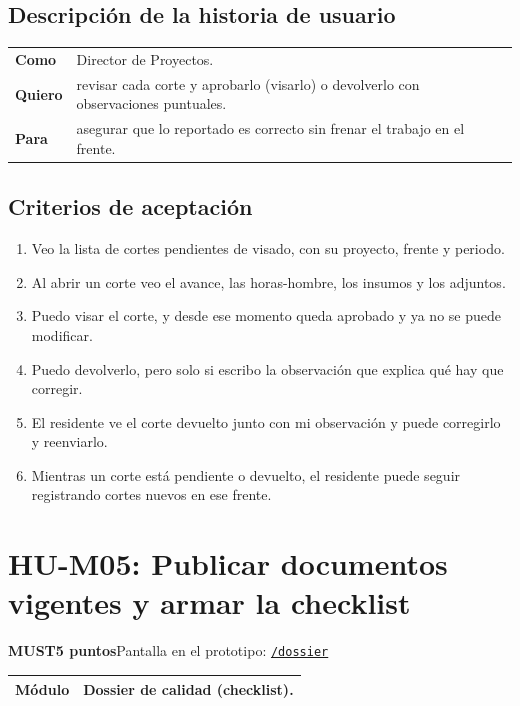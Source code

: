 \documentclass[11pt]{article}
\newcommand{\urlapp}{https://thankstochatgpt.github.io/LOARD}
\newcommand{\app}[1]{\href{\urlapp#1}{\texttt{#1}}}
\newcommand{\etiqueta}[1]{\colorbox{barra}{\textbf{\color{marca}#1}}}
\begin{document}
\subsection*{Descripción de la historia de usuario}

\begin{tabular}{>{\bfseries}p{2.4cm} p{13.4cm}}
\toprule
Como & Director de Proyectos. \\
Quiero & revisar cada corte y aprobarlo (visarlo) o devolverlo con observaciones puntuales. \\
Para & asegurar que lo reportado es correcto sin frenar el trabajo en el frente. \\
\bottomrule
\end{tabular}

\subsection*{Criterios de aceptación}

\begin{enumerate}
\item Veo la lista de cortes pendientes de visado, con su proyecto, frente y periodo.
\item Al abrir un corte veo el avance, las horas-hombre, los insumos y los adjuntos.
\item Puedo visar el corte, y desde ese momento queda aprobado y ya no se puede modificar.
\item Puedo devolverlo, pero solo si escribo la observación que explica qué hay que corregir.
\item El residente ve el corte devuelto junto con mi observación y puede corregirlo y reenviarlo.
\item Mientras un corte está pendiente o devuelto, el residente puede seguir registrando cortes nuevos en ese frente.
\end{enumerate}


\newpage
\section*{HU-M05: Publicar documentos vigentes y armar la checklist}
\etiqueta{MUST}\quad\etiqueta{5 puntos}\quad Pantalla en el prototipo: \app{/dossier}

\begin{tabular}{>{\bfseries}p{2.4cm} p{13.4cm}}
\toprule
Módulo & Dossier de calidad (checklist). \\
\bottomrule
\end{tabular}
\end{document}
